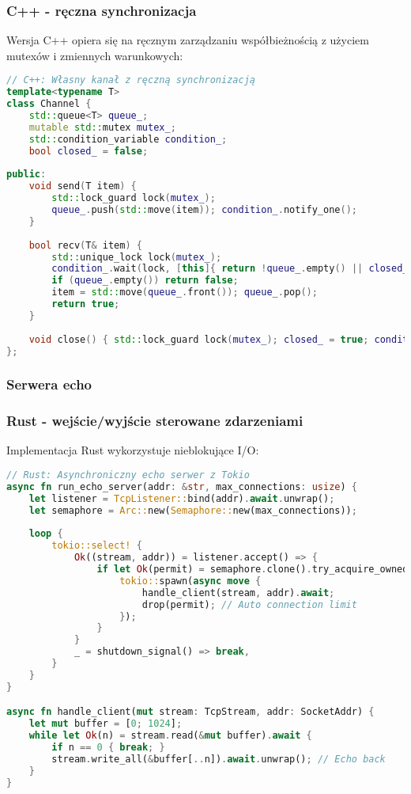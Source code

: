 \subsubsection{C++ - ręczna synchronizacja}
Wersja C++ opiera się na ręcznym zarządzaniu współbieżnością z użyciem mutexów i zmiennych warunkowych:
\begin{lstlisting}[language=C++, style=VS2017,  caption={Producent-Konsument w C++ z Channel}, label={lst:cpp_producer_consumer}]
// C++: Własny kanał z ręczną synchronizacją
template<typename T>
class Channel {
    std::queue<T> queue_;
    mutable std::mutex mutex_;
    std::condition_variable condition_;
    bool closed_ = false;
    
public:
    void send(T item) { 
        std::lock_guard lock(mutex_); 
        queue_.push(std::move(item)); condition_.notify_one(); 
    }
    
    bool recv(T& item) {
        std::unique_lock lock(mutex_);
        condition_.wait(lock, [this]{ return !queue_.empty() || closed_; });
        if (queue_.empty()) return false;
        item = std::move(queue_.front()); queue_.pop();
        return true;
    }
    
    void close() { std::lock_guard lock(mutex_); closed_ = true; condition_.notify_all(); }
};
\end{lstlisting}

\subsubsection{Serwera echo}

\subsubsection{Rust - wejście/wyjście sterowane zdarzeniami}
Implementacja Rust wykorzystuje nieblokujące I/O:
\begin{lstlisting}[language=Rust, caption={Echo Serwer w Rust z Tokio}, label={lst:rust_echo_server}]
// Rust: Asynchroniczny echo serwer z Tokio
async fn run_echo_server(addr: &str, max_connections: usize) {
    let listener = TcpListener::bind(addr).await.unwrap();
    let semaphore = Arc::new(Semaphore::new(max_connections));
    
    loop {
        tokio::select! {
            Ok((stream, addr)) = listener.accept() => {
                if let Ok(permit) = semaphore.clone().try_acquire_owned() {
                    tokio::spawn(async move {
                        handle_client(stream, addr).await;
                        drop(permit); // Auto connection limit
                    });
                }
            }
            _ = shutdown_signal() => break,
        }
    }
}

async fn handle_client(mut stream: TcpStream, addr: SocketAddr) {
    let mut buffer = [0; 1024];
    while let Ok(n) = stream.read(&mut buffer).await {
        if n == 0 { break; }
        stream.write_all(&buffer[..n]).await.unwrap(); // Echo back
    }
}
\end{lstlisting}

